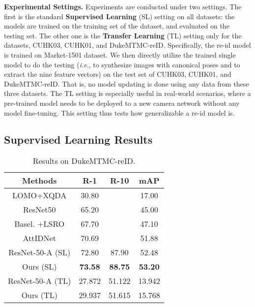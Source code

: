 \documentclass[10pt,letterpaper,twocolumn,10pt,letterpaper,twocolumn]{article}
\providecommand{\tabularnewline}{\\}
\begin{document}
\noindent \textbf{Experimental Settings.} Experiments are conducted
under two settings. The first is the standard \textbf{Supervised Learning}
(SL) setting on all datasets: the models are trained on the training
set of the dataset, and evaluated on the testing set. The other one
is the \textbf{Transfer Learning} (TL) setting only for the datasets,
CUHK03, CUHK01, and DukeMTMC-reID. Specifically, the re-id model is
trained on Market-1501 dataset. We then directly utilize the trained
single model to do the testing (\emph{i.e}., to synthesize images
with canonical poses and to extract the nine feature vectors) on the
test set of CUHK03, CUHK01, and DukeMTMC-reID. That is, no model updating
is done using any data from these three datasets. The TL setting is
especially useful in real-world scenarios, where a pre-trained model
needs to be deployed to a new camera network without any model fine-tuning.
This setting thus tests how generalizable a re-id model is.

\subsection{Supervised Learning Results}

\begin{table}
\begin{centering}
{\small{}}\begin{tabular}{c||ccc}
\hline 
{\small{}{}Methods } & {\small{}{}{}R-1 } & {\small{}{}{}R-10 } & {\small{}{}{}mAP }\tabularnewline
\hline 
{\small{}LOMO+XQDA\cite{XQDA} } & {\small{}{}30.80 } & {\small{}{}\textendash{} } & {\small{}{}17.00}\tabularnewline
{\small{}{}ResNet50 \cite{resnet} } & {\small{}{}65.20 } & {\small{}{}\textendash{} } & {\small{}{}45.00}\tabularnewline
{\small{}{}Basel. +LSRO \cite{zheng2017unlabeled} } & {\small{}{}67.70 } & {\small{}{}\textendash{} } & {\small{}{}47.10}\tabularnewline
{\small{}{}AttIDNet \cite{lin2017improving} } & {\small{}{}70.69 } & {\small{}{}\textendash{} } & {\small{}{}51.88}\tabularnewline
\hline 
\hline 
{\small{}ResNet-50-A (SL)} & 72.80 & 87.90 & 52.48\tabularnewline
{\small{}{}{}Ours (SL)} & \textbf{\small{}{}73.58} & \textbf{\small{}{}88.75} & \textbf{\small{}{}53.20}\tabularnewline
\hline 
{\small{}ResNet-50-A (TL)} & 27.872 & 51.122 & 13.942\tabularnewline
{\small{}{}{}Ours (TL)} & 29.937 & 51.615 & 15.768\tabularnewline
\hline 
\end{tabular}
\par\end{centering}{\small \par}
\caption{\label{tab:Results-on-the-Duke}Results on DukeMTMC-reID.}
\end{table}
\end{document}
